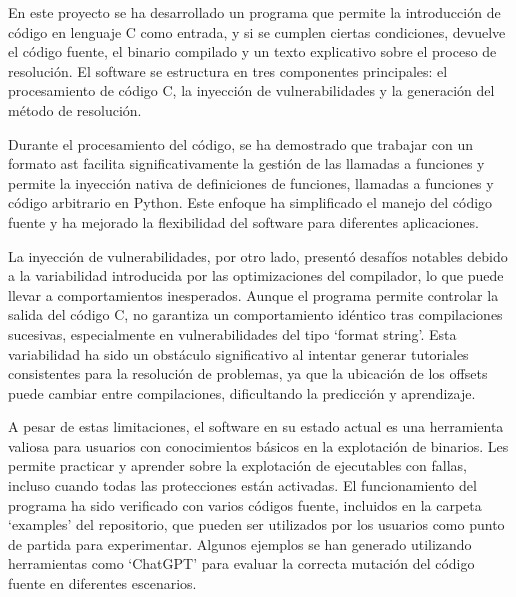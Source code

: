 En este proyecto se ha desarrollado un programa que permite la introducción de código en lenguaje C como entrada, y si se cumplen ciertas condiciones, devuelve el código fuente, el binario compilado y un texto explicativo sobre el proceso de resolución. El software se estructura en tres componentes principales: el procesamiento de código C, la inyección de vulnerabilidades y la generación del método de resolución.

Durante el procesamiento del código, se ha demostrado que trabajar con un formato \acrfull{ast} facilita significativamente la gestión de las llamadas a funciones y permite la inyección nativa de definiciones de funciones, llamadas a funciones y código arbitrario en Python. Este enfoque ha simplificado el manejo del código fuente y ha mejorado la flexibilidad del software para diferentes aplicaciones.

La inyección de vulnerabilidades, por otro lado, presentó desafíos notables debido a la variabilidad introducida por las optimizaciones del compilador, lo que puede llevar a comportamientos inesperados. Aunque el programa permite controlar la salida del código C, no garantiza un comportamiento idéntico tras compilaciones sucesivas, especialmente en vulnerabilidades del tipo ‘format string’. Esta variabilidad ha sido un obstáculo significativo al intentar generar tutoriales consistentes para la resolución de problemas, ya que la ubicación de los offsets puede cambiar entre compilaciones, dificultando la predicción y aprendizaje.

A pesar de estas limitaciones, el software en su estado actual es una herramienta valiosa para usuarios con conocimientos básicos en la explotación de binarios. Les permite practicar y aprender sobre la explotación de ejecutables con fallas, incluso cuando todas las protecciones están activadas.
El funcionamiento del programa ha sido verificado con varios códigos fuente, incluidos en la carpeta ‘examples’ del repositorio, que pueden ser utilizados por los usuarios como punto de partida para experimentar.
Algunos ejemplos se han generado utilizando herramientas como ‘ChatGPT’ para evaluar la correcta mutación del código fuente en diferentes escenarios.